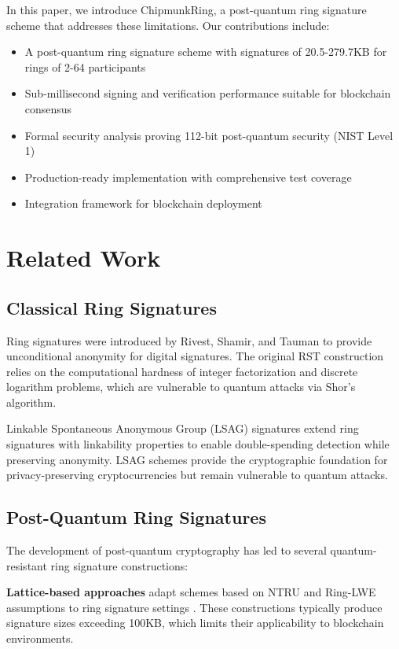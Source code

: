\documentclass[11pt,a4paper]{article}
\begin{document}
In this paper, we introduce ChipmunkRing, a post-quantum ring signature scheme that addresses these limitations. Our contributions include:

\begin{itemize}
\item A post-quantum ring signature scheme with signatures of 20.5-279.7KB for rings of 2-64 participants
\item Sub-millisecond signing and verification performance suitable for blockchain consensus
\item Formal security analysis proving 112-bit post-quantum security (NIST Level 1)
\item Production-ready implementation with comprehensive test coverage
\item Integration framework for blockchain deployment
\end{itemize}

\section{Related Work}

\subsection{Classical Ring Signatures}

Ring signatures were introduced by Rivest, Shamir, and Tauman \cite{rst01} to provide unconditional anonymity for digital signatures. The original RST construction relies on the computational hardness of integer factorization and discrete logarithm problems, which are vulnerable to quantum attacks via Shor's algorithm.

Linkable Spontaneous Anonymous Group (LSAG) signatures \cite{lsag04} extend ring signatures with linkability properties to enable double-spending detection while preserving anonymity. LSAG schemes provide the cryptographic foundation for privacy-preserving cryptocurrencies but remain vulnerable to quantum attacks.

\subsection{Post-Quantum Ring Signatures}

The development of post-quantum cryptography has led to several quantum-resistant ring signature constructions:

\textbf{Lattice-based approaches} adapt schemes based on NTRU and Ring-LWE assumptions to ring signature settings \cite{lattice-rings}. These constructions typically produce signature sizes exceeding 100KB, which limits their applicability to blockchain environments.
\end{document}
